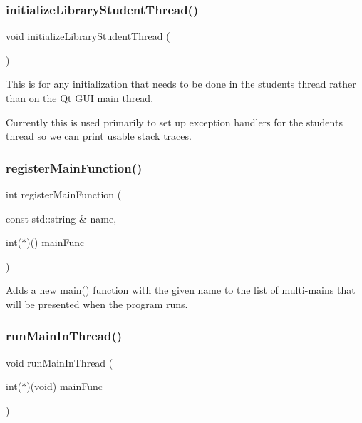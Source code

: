 \subsubsection{\texorpdfstring{initialize\+Library\+Student\+Thread()}{initializeLibraryStudentThread()}}
{\footnotesize\ttfamily void initialize\+Library\+Student\+Thread (\begin{DoxyParamCaption}{ }\end{DoxyParamCaption})}



This is for any initialization that needs to be done in the student\textquotesingle{}s thread rather than on the Qt G\+UI main thread. 

Currently this is used primarily to set up exception handlers for the student\textquotesingle{}s thread so we can print usable stack traces. \mbox{\label{namespacestanfordcpplib_ac7f9e21c9018a3022a368fd03c7ac337}} 
\subsubsection{\texorpdfstring{register\+Main\+Function()}{registerMainFunction()}}
{\footnotesize\ttfamily int register\+Main\+Function (\begin{DoxyParamCaption}\item[{const std\+::string \&}]{name,  }\item[{int($\ast$)()}]{main\+Func }\end{DoxyParamCaption})}



Adds a new main() function with the given name to the list of multi-\/mains that will be presented when the program runs. 

\mbox{\label{namespacestanfordcpplib_ab6f7bb8a7230f2d95cf1ff0d6f2fbf0e}} 
\subsubsection{\texorpdfstring{run\+Main\+In\+Thread()}{runMainInThread()}\hspace{0.1cm}{\footnotesize\ttfamily [1/2]}}
{\footnotesize\ttfamily void run\+Main\+In\+Thread (\begin{DoxyParamCaption}\item[{int($\ast$)(void)}]{main\+Func }\end{DoxyParamCaption})}



